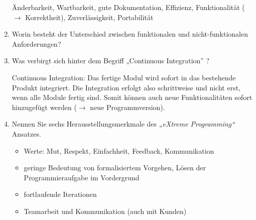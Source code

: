 \documentclass{bschlangaul-aufgabe}
\begin{document}
\begin{enumerate}
\begin{liAntwort}
Änderbarkeit, Wartbarkeit, gute Dokumentation, Effizienz, Funktionalität
($\rightarrow$ Korrektheit), Zuverlässigkeit, Portabilität
\end{liAntwort}

%

\item Worin besteht der Unterschied zwischen
funktionalen und nicht-funktionalen
Anforderungen?


%

\item Was verbirgt sich hinter dem Begriff „Continuous Integration”
?

\begin{liAntwort}
Continuous Integration: Das fertige Modul wird sofort in das bestehende
Produkt integriert. Die Integration erfolgt also schrittweise und nicht
erst, wenn alle Module fertig sind. Somit können auch neue
Funktionalitäten sofort hinzugefügt werden ($\rightarrow$ neue
Programmversion).
\end{liAntwort}

%

\item Nennen Sie sechs Herausstellungsmerkmale des \emph{„eXtreme
Programming“} Ansatzes.

\begin{liAntwort}
\begin{itemize}
\item Werte: Mut, Respekt, Einfachheit, Feedback, Kommunikation

\item geringe Bedeutung von formalisiertem Vorgehen, Lösen der
Programmieraufgabe im Vordergrund

\item fortlaufende Iterationen

\item Teamarbeit und Kommunikation (auch mit Kunden)


\end{itemize}
\end{liAntwort}
\end{enumerate}
\end{document}
